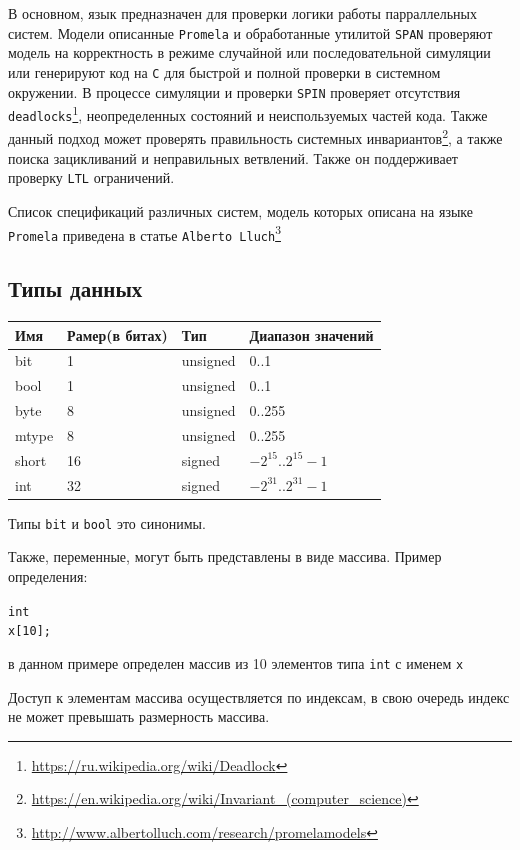 \documentclass[12pt, twoside]{report}
\newcommand{\cname}[1] {
\textcolor{atnotation}{#1}
}
\begin{document}
В основном, язык предназначен для проверки логики работы парраллельных систем. Модели описанные
\texttt{Promela} и обработанные утилитой \texttt{SPAN} проверяют модель на корректность в режиме случайной
или последовательной симуляции или генерируют код на \texttt{C} для быстрой и полной проверки в системном окружении.
В процессе симуляции и проверки \texttt{SPIN} проверяет отсутствия \texttt{deadlocks}\footnote{\url{https://ru.wikipedia.org/wiki/Deadlock}},
неопределенных состояний и неиспользуемых частей кода. Также данный подход может проверять правильность системных инвариантов\footnote{\url{https://en.wikipedia.org/wiki/Invariant_(computer_science)}},
а также поиска зацикливаний и неправильных ветвлений. Также он поддерживает проверку \texttt{LTL} ограничений.

Список спецификаций различных систем, модель которых описана на языке \texttt{Promela}
приведена в статье \texttt{Alberto Lluch}\footnote{\url{http://www.albertolluch.com/research/promelamodels}}
\subsection*{Типы данных}\label{promela_language_DATATYPES}

\begin{tabular}{l|l|l|l}
  \hline
  Имя   & Рамер(в битах) & Тип & Диапазон значений \\ \hline
  bit   & 1 & unsigned & 0..1 \\ \hline
  bool  & 1 & unsigned & 0..1 \\ \hline
  byte  & 8 & unsigned & 0..255 \\ \hline
  mtype & 8 & unsigned & 0..255 \\ \hline
  short & 16 & signed & $-2^15$..$2^15 - 1$ \\ \hline
  int   & 32 & signed & $-2^31$..$2^31 - 1$ \\ \hline
  \hline
\end{tabular}

Типы \texttt{bit} и \texttt{bool} это синонимы.

Также, переменные, могут быть представлены в виде массива. Пример определения:
\begin{alltt}
\cname{int} x [10];
\end{alltt}
в данном примере определен массив из 10 элементов типа \texttt{int} с именем \texttt{x}

Доступ к элементам массива осуществляется по индексам, в свою очередь индекс не может
превышать размерность массива.
\end{document}
